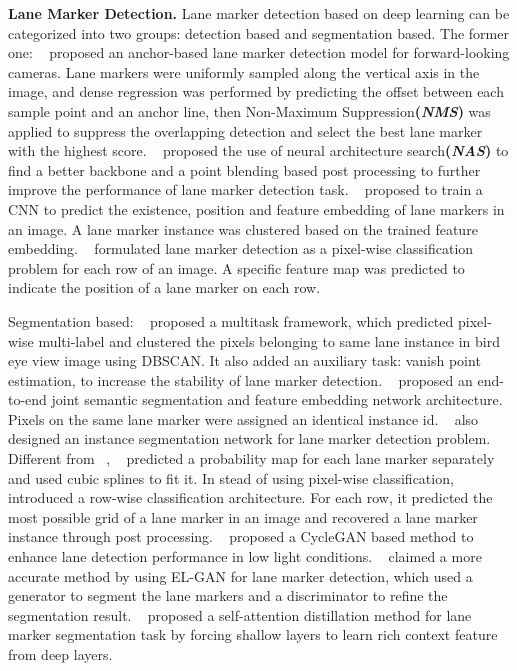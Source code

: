 \documentclass[final]{cvpr}
\begin{document}
\textbf{Lane Marker Detection.} Lane marker detection based on deep learning can be categorized into two groups: detection based and segmentation based. The former one: ~\cite{chen2019pointlanenet} proposed an anchor-based lane marker detection model for forward-looking cameras. Lane markers were uniformly sampled along the vertical axis in the image, and dense regression was performed by predicting the offset between each sample point and an anchor line, then  Non-Maximum Suppression\textbf{(\textit{NMS})} was applied to suppress the overlapping detection and select the best lane marker with the highest score. ~\cite{CurveLane-NAS} proposed the use of neural architecture search\textbf{(\textit{NAS})} to find a better backbone and a point blending based post processing to further improve the performance of lane marker detection task. ~\cite{ko2020key} proposed to train a CNN to predict the existence, position and feature embedding of lane markers in an image. A lane marker instance was clustered based on the trained feature embedding. ~\cite{qin2020ultra} formulated lane marker detection as a pixel-wise classification problem for each row of an image. A specific feature map was predicted to indicate the position of a lane marker on each row.

Segmentation based: ~\cite{lee2017vpgnet} proposed a multitask framework, which predicted pixel-wise multi-label and clustered the pixels belonging to same lane instance in bird eye view image using DBSCAN. It also added an auxiliary task: vanish point estimation, to increase the stability of lane marker detection. ~\cite{neven2018towards} proposed an end-to-end joint semantic segmentation and feature embedding network architecture. Pixels on the same lane marker were assigned an identical instance id. ~\cite{pan2017spatial} also designed an instance segmentation network for lane marker detection problem. Different from ~\cite{neven2018towards}, ~\cite{pan2017spatial} predicted a probability map for each lane marker separately and used cubic splines to fit it. In stead of using pixel-wise classification, \cite{yoo2020end} introduced a row-wise classification architecture. For each row, it predicted the most possible grid of a lane marker in an image and recovered a lane marker instance through post processing. ~\cite{liu2020lane} proposed a CycleGAN based method to enhance lane detection performance in low light conditions. ~\cite{ghafoorian2018gan} claimed a more accurate method by using EL-GAN for lane marker detection, which used a generator to segment the lane markers and a discriminator to refine the segmentation result. ~\cite{hou2019learning} proposed a self-attention distillation method for lane marker segmentation task by forcing shallow layers to learn rich context feature from deep layers. 
\end{document}
